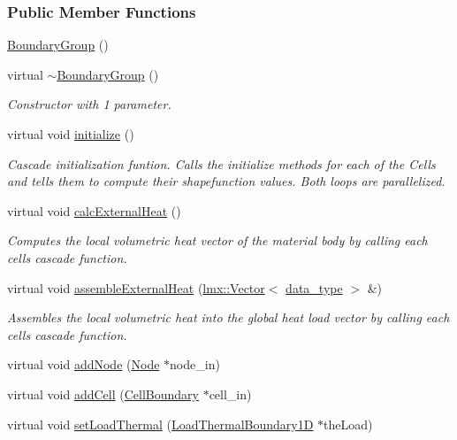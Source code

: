 \subsubsection*{Public Member Functions}
\begin{DoxyCompactItemize}
\item 
\hyperlink{classmknix_1_1_boundary_group_a1ed5b1b020af6ed3321b501be28206b4}{Boundary\+Group} ()
\item 
virtual \hyperlink{classmknix_1_1_boundary_group_ae05b627df857d6c6525f096e2870ff0a}{$\sim$\+Boundary\+Group} ()
\begin{DoxyCompactList}\small\item\em Constructor with 1 parameter. \end{DoxyCompactList}\item 
virtual void \hyperlink{classmknix_1_1_boundary_group_af82241f10da2001d12c6557cfac7d565}{initialize} ()
\begin{DoxyCompactList}\small\item\em Cascade initialization funtion. Calls the initialize methods for each of the Cells and tells them to compute their shapefunction values. Both loops are parallelized. \end{DoxyCompactList}\item 
virtual void \hyperlink{classmknix_1_1_boundary_group_aa534d94502044262eff775598d16773c}{calc\+External\+Heat} ()
\begin{DoxyCompactList}\small\item\em Computes the local volumetric heat vector of the material body by calling each cell\textquotesingle{}s cascade function. \end{DoxyCompactList}\item 
virtual void \hyperlink{classmknix_1_1_boundary_group_a6ba6b458bf600bd949855c80301c9636}{assemble\+External\+Heat} (\hyperlink{classlmx_1_1_vector}{lmx\+::\+Vector}$<$ \hyperlink{namespacemknix_a16be4b246fbf2cceb141e3a179111020}{data\+\_\+type} $>$ \&)
\begin{DoxyCompactList}\small\item\em Assembles the local volumetric heat into the global heat load vector by calling each cell\textquotesingle{}s cascade function. \end{DoxyCompactList}\item 
virtual void \hyperlink{classmknix_1_1_boundary_group_af522d9ba6100877bfe7c02ee5654f609}{add\+Node} (\hyperlink{classmknix_1_1_node}{Node} $\ast$node\+\_\+in)
\item 
virtual void \hyperlink{classmknix_1_1_boundary_group_a78be50152897f62f4417fdb03653f92e}{add\+Cell} (\hyperlink{classmknix_1_1_cell_boundary}{Cell\+Boundary} $\ast$cell\+\_\+in)
\item 
virtual void \hyperlink{classmknix_1_1_boundary_group_ac4cba644c5ec528422342dfb90ba0458}{set\+Load\+Thermal} (\hyperlink{classmknix_1_1_load_thermal_boundary1_d}{Load\+Thermal\+Boundary1\+D} $\ast$the\+Load)
\end{DoxyCompactItemize}
